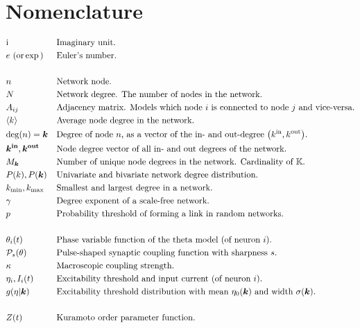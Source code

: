 \newpage
\section*{Nomenclature}
\vspace{-.5cm}
\begin{alignat*}{2}
& \ic &&\text{Imaginary unit.}\\
&e \text{ (or} \exp\text{)} &&\text{Euler's number.}\\ \\
& n&&\text{Network node.}\\
& N &&\text{Network degree. The number of nodes in the network.}\\
& A_{ij} &&\text{Adjacency matrix. Models which node $i$ is connected to node $j$ and vice-versa.}\\
& \kmean &&\text{Average node degree in the network.}\\
& \degree(n) = \k &&\text{Degree of node $n$, as a vector of the in- and out-degree $\left(\kin, \kout \right)$.}\\
& \kinb, \koutb && \text{Node degree vector of all in- and out degrees of the network.} \\
& M_{\k} &&\text{Number of unique node degrees in the network. Cardinality of $\K$.}\\
& P(k), P(\k) &&\text{Univariate and bivariate network degree distribution.}\\
&\kmin, \kmax &&\text{Smallest and largest degree in a network.}\\ 
&\gamma &&\text{Degree exponent of a scale-free network.}\\ 
&p &&\text{Probability threshold of forming a link in random networks.}\\ \\
&\theta_i(t) &&\text{Phase variable function of the theta model (of neuron $i$).}\\
& \Pulse_s (\theta)&&\text{Pulse-shaped synaptic coupling function with sharpness } s \text{.}\\
&\kappa &&\text{Macroscopic coupling strength.}\\
&\eta_i, I_i(t) &&\text{Excitability threshold and input current (of neuron $i$).}\\
&g(\eta \rvert \k) \quad &&\text{Excitability threshold distribution with mean $\eta_0(\k)$ and width $\sigma(\k)$.}\\ \\
& Z(t) &&\text{Kuramoto order parameter function.}\\

\end{alignat*}
